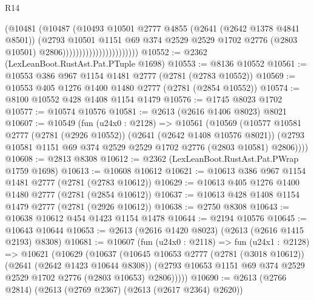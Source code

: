 \begin{lexlean}{R14}
\begin{coremodule}
                                          (@10481
                                            (@10487
                                              (@10493
                                                @10501
                                                @2777
                                                @4855
                                                (@2641 (@2642 @1378 @4841 @8501))
                                                (@2793
                                                  @10501
                                                  @1151
                                                  @69
                                                  @374
                                                  @2529
                                                  @2529
                                                  @1702
                                                  @2776
                                                  (@2803 @10501)
                                                  @2806)))))))))))))))))))))))
@10552 := @2362 (LexLeanBoot.RustAst.Pat.PTuple @1698)
@10553 := @8136 @10552
@10561 := @10553 @386 @967 @1154 @1481 @2777 (@2781 (@2783 @10552))
@10569 := @10553 @405 @1276 @1400 @1480 @2777 (@2781 (@2854 @10552))
@10574 := @8100 @10552 @428 @1408 @1154 @1479
@10576 := @1745 @8023 @1702
@10577 := @10574 @10576
@10581 := @2613 (@2616 @1406 @8023) @8021
@10607 := @10549
    (fun (u24x0 : @2128) =>
    @10561
      (@10569
        (@10577
          @10581
          @2777
          (@2781 (@2926 @10552))
          (@2641 (@2642 @1408 @10576 @8021))
          (@2793 @10581 @1151 @69 @374 @2529 @2529 @1702 @2776 (@2803 @10581) @2806))))
@10608 := @2813 @8308
@10612 := @2362 (LexLeanBoot.RustAst.Pat.PWrap @1759 @1698)
@10613 := @10608 @10612
@10621 := @10613 @386 @967 @1154 @1481 @2777 (@2781 (@2783 @10612))
@10629 := @10613 @405 @1276 @1400 @1480 @2777 (@2781 (@2854 @10612))
@10637 := @10613 @428 @1408 @1154 @1479 @2777 (@2781 (@2926 @10612))
@10638 := @2750 @8308
@10643 := @10638 @10612 @454 @1423 @1154 @1478
@10644 := @2194 @10576
@10645 := @10643 @10644
@10653 := @2613 (@2616 @1420 @8023) (@2613 (@2616 @1415 @2193) @8308)
@10681 := @10607
    (fun (u24x0 : @2118) =>
    fun (u24x1 : @2128) =>
    @10621
      (@10629
        (@10637
          (@10645
            @10653
            @2777
            (@2781 (@3018 @10612))
            (@2641 (@2642 @1423 @10644 @8308))
            (@2793 @10653 @1151 @69 @374 @2529 @2529 @1702 @2776 (@2803 @10653) @2806)))))
@10690 := @2613 (@2766 @2814) (@2613 (@2769 @2367) (@2613 (@2617 @2364) @2620))

\end{coremodule}
\end{lexlean}
